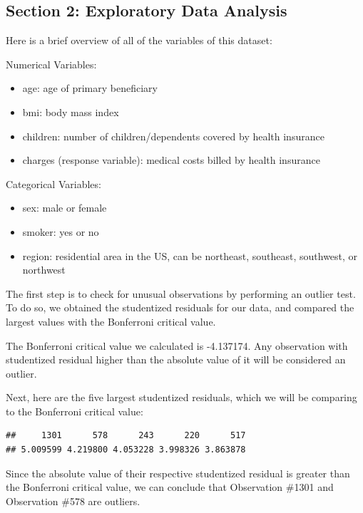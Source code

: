 \documentclass[
  12pt,
]{article}
\providecommand{\tightlist}{%
  \setlength{\itemsep}{0pt}\setlength{\parskip}{0pt}}
\begin{document}
\newpage

\subsection{Section 2: Exploratory Data
Analysis}\label{section-2-exploratory-data-analysis}

Here is a brief overview of all of the variables of this dataset:

Numerical Variables:

\begin{itemize}
\tightlist
\item
  age: age of primary beneficiary
\item
  bmi: body mass index
\item
  children: number of children/dependents covered by health insurance
\item
  charges (response variable): medical costs billed by health insurance
\end{itemize}

Categorical Variables:

\begin{itemize}
\tightlist
\item
  sex: male or female
\item
  smoker: yes or no
\item
  region: residential area in the US, can be northeast, southeast,
  southwest, or northwest
\end{itemize}

The first step is to check for unusual observations by performing an
outlier test. To do so, we obtained the studentized residuals for our
data, and compared the largest values with the Bonferroni critical
value.

The Bonferroni critical value we calculated is -4.137174. Any
observation with studentized residual higher than the absolute value of
it will be considered an outlier.

Next, here are the five largest studentized residuals, which we will be
comparing to the Bonferroni critical value:

\begin{verbatim}
##     1301      578      243      220      517 
## 5.009599 4.219800 4.053228 3.998326 3.863878
\end{verbatim}

Since the absolute value of their respective studentized residual is
greater than the Bonferroni critical value, we can conclude that
Observation \#1301 and Observation \#578 are outliers.
\end{document}
